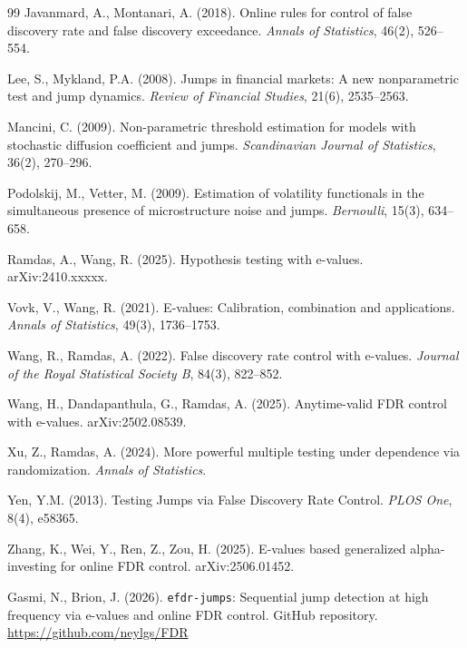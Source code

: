 \documentclass[11pt,a4paper,twocolumn]{article}
\theoremstyle{plain}
\theoremstyle{definition}
\theoremstyle{remark}
\begin{document}
\begin{thebibliography}{99}
Javanmard, A., Montanari, A. (2018).
Online rules for control of false discovery rate and false discovery
exceedance.
\emph{Annals of Statistics}, 46(2), 526--554.

Lee, S., Mykland, P.A. (2008).
Jumps in financial markets: A new nonparametric test and jump dynamics.
\emph{Review of Financial Studies}, 21(6), 2535--2563.

Mancini, C. (2009).
Non-parametric threshold estimation for models with stochastic diffusion
coefficient and jumps.
\emph{Scandinavian Journal of Statistics}, 36(2), 270--296.

Podolskij, M., Vetter, M. (2009).
Estimation of volatility functionals in the simultaneous presence of
microstructure noise and jumps.
\emph{Bernoulli}, 15(3), 634--658.

Ramdas, A., Wang, R. (2025).
Hypothesis testing with e-values.
arXiv:2410.xxxxx.

Vovk, V., Wang, R. (2021).
E-values: Calibration, combination and applications.
\emph{Annals of Statistics}, 49(3), 1736--1753.

Wang, R., Ramdas, A. (2022).
False discovery rate control with e-values.
\emph{Journal of the Royal Statistical Society B}, 84(3), 822--852.

Wang, H., Dandapanthula, G., Ramdas, A. (2025).
Anytime-valid FDR control with e-values.
arXiv:2502.08539.

Xu, Z., Ramdas, A. (2024).
More powerful multiple testing under dependence via randomization.
\emph{Annals of Statistics}.

Yen, Y.M. (2013).
Testing Jumps via False Discovery Rate Control.
\emph{PLOS One}, 8(4), e58365.

Zhang, K., Wei, Y., Ren, Z., Zou, H. (2025).
E-values based generalized alpha-investing for online FDR control.
arXiv:2506.01452.

Gasmi, N., Brion, J. (2026).
\texttt{efdr-jumps}: Sequential jump detection at high frequency via e-values and online FDR control.
GitHub repository.
\url{https://github.com/neylgs/FDR}

\end{thebibliography}
\end{document}
